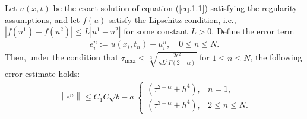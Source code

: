 \documentclass[10pt,a4paper]{amsart}
\begin{document}
\begin{theorem}\label{Th.4.8}
Let $u(x,t)$ be the exact solution of equation
(\ref{eq.1.1}) satisfying the regularity assumptions,
and let $f(u)$ satisfy the Lipschitz condition,
i.e.,
$\left|f(u^1) - f(u^2)\right| \leq L|u^1 - u^2|
$
for some constant $L>0$. Define the error term
\begin{align*}
e_{i}^n := u(x_i,t_n) - u_{i}^n, \quad 0 \leq n \leq N.
\end{align*}
Then, under the condition that $\tau_{\max} \leq \sqrt[\alpha]{\frac{2\epsilon^2}{\kappa L^2 \Gamma(2-\alpha)}}$ for $1 \leq n \leq N$, the following error estimate holds:
\begin{align*}
\left\| e^n\right\| \leq C_1 C\sqrt{b-a}
\begin{cases}
\left(\tau^{2-\alpha}+h^4\right), & n =1, \\
\left(\tau^{3-\alpha}+h^4\right), & 2\leq n \leq N.
\end{cases}
\end{align*}
\end{theorem}
\end{document}
